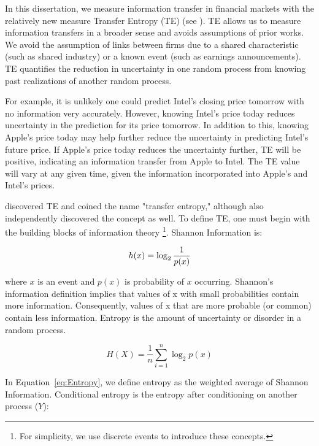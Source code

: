 In this dissertation,  we measure information transfer in financial markets with the relatively new measure Transfer Entropy (TE)  (see \cite{IntroToTransferEntropy}).  TE allows us to measure information transfers in a broader sense and avoids assumptions of prior works.  We avoid the assumption of links between firms due to a shared characteristic (such as shared industry) or a known event (such as earnings announcements).   TE quantifies the reduction in uncertainty in one random process from knowing past realizations of another random process.  

For example, it is unlikely one could predict Intel's closing price tomorrow with no information very accurately.  However, knowing Intel's price today reduces uncertainty in the prediction for its price tomorrow.  In addition to this, knowing Apple's price today may help further reduce the uncertainty in predicting Intel's future price.  If Apple's price today reduces the uncertainty further, TE will be positive, indicating an information transfer from Apple to Intel.   The TE value will vary at any given time, given the information incorporated into Apple's and Intel's prices.

\cite{IntroToTransferEntropy} discovered TE and coined the name "transfer entropy," although  \cite{IntroToTransferEntropy2} also independently discovered the concept as well.  To define TE, one must begin with the building blocks of information theory \footnote{For simplicity, we use discrete events to introduce these concepts.}.  Shannon Information is: 

\begin{equation}
\label{{eq:shannonInfo}}
h(x) = \log_2 \frac{1}{p(x)}
\end{equation}

\noindent where \(x\) is an event and \(p(x)\) is probability of \(x\) occurring. Shannon's information definition implies that values of x with small probabilities contain more information. Consequently, values of x that are more probable (or common) contain less information. Entropy is the amount of uncertainty or disorder in a random process.

\begin{equation}
\label{eq:Entropy}
H(X) =  \frac{1}{n} \sum_{i=1}^n  \log_2 p(x)
\end{equation}


\noindent In Equation~\ref{eq:Entropy}, we define entropy as the weighted average of Shannon Information.  Conditional entropy is the entropy after conditioning on another process (\(Y\)):

